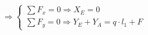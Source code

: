 \documentclass[preview]{standalone}
\begin{document}
\begin{align*}
{{\Longrightarrow \left\{\begin{array}{lc}\sum F_x = 0 \Longrightarrow X_E = 0 \\ \sum F_y = 0 \Longrightarrow Y_E + Y_A = q\cdot l_1 + F \end{array}\right. } }
\end{align*}
\end{document}
